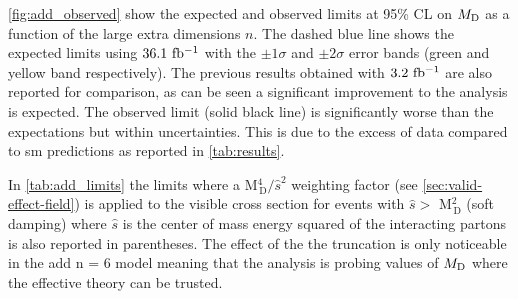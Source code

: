 \cref{fig:add_observed} show the expected and observed limits at 95\% CL on
$M_\mathrm{D}$ as a function of the large extra dimensions $n$. The dashed blue line
shows the expected limits using $36.1~\mbox{fb$^{-1}$}$ with the $\pm 1 \sigma$ and
$\pm 2 \sigma$ error bands (green and yellow band respectively). The previous
results obtained with $3.2~\mbox{fb$^{-1}$}$ are also reported for comparison, as can be
seen a significant improvement to the analysis is expected. The observed limit
(solid black line) is significantly worse than the expectations but within
uncertainties. This is due to the excess of data compared to \gls{sm}
predictions as reported in \cref{tab:results}.

In \cref{tab:add_limits} the limits where a M$^4_\mathrm{\, D} / \hat{s}^2$
weighting factor (see \cref{sec:valid-effect-field}) is applied to the visible
cross section for events with $\hat{s} > $ M$^2_\mathrm{\, D}$ (soft damping)
where $\hat{s}$ is the center of mass energy squared of the interacting partons
is also reported in parentheses. The effect of the the truncation is only
noticeable in the \gls{add} n = 6 model meaning that the analysis is probing
values of $M_\mathrm{D}$ where the effective theory can be trusted.


